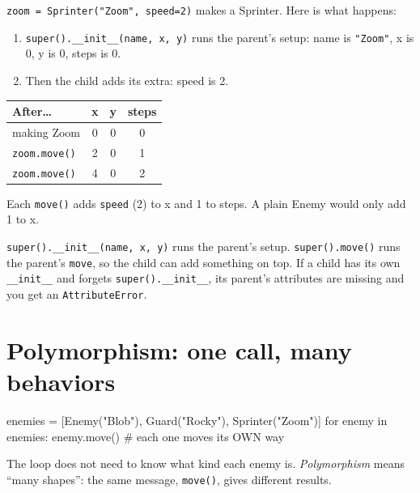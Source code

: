 \begin{workedexample}
\texttt{zoom = Sprinter("Zoom", speed=2)} makes a Sprinter. Here is what happens:
\begin{enumerate}[itemsep=1pt]
  \item \texttt{super().\_\_init\_\_(name, x, y)} runs the parent's setup: name is \texttt{"Zoom"}, x is 0, y is 0, steps is 0.
  \item Then the child adds its extra: speed is 2.
\end{enumerate}
\begin{center}
\renewcommand{\arraystretch}{1.25}
\begin{tabular}{@{}lccc@{}}
\toprule
\textbf{After\ldots} & \textbf{x} & \textbf{y} & \textbf{steps} \\ \midrule
making Zoom & 0 & 0 & 0 \\
\texttt{zoom.move()} & 2 & 0 & 1 \\
\texttt{zoom.move()} & 4 & 0 & 2 \\
\bottomrule
\end{tabular}
\end{center}
Each \texttt{move()} adds \texttt{speed} (2) to x and 1 to steps. A plain Enemy would only add 1 to x.
\end{workedexample}

\begin{tip}[super() = \enquote{do the parent's part}]
\texttt{super().\_\_init\_\_(name, x, y)} runs the parent's setup. \texttt{super().move()} runs the parent's \texttt{move}, so the child can add something on top. If a child has its own \texttt{\_\_init\_\_} and forgets \texttt{super().\_\_init\_\_}, its parent's attributes are missing and you get an \texttt{AttributeError}.
\end{tip}

\section{Polymorphism: one call, many behaviors}
\begin{pycode}
enemies = [Enemy("Blob"), Guard("Rocky"), Sprinter("Zoom")]
for enemy in enemies:
    enemy.move()        # each one moves its OWN way
\end{pycode}
The loop does not need to know what kind each enemy is. \emph{Polymorphism} means \enquote{many shapes}: the same message, \texttt{move()}, gives different results.


